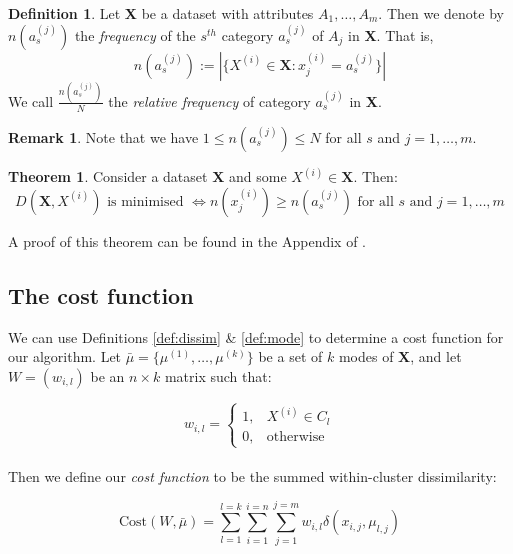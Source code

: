 \documentclass{article}
\theoremstyle{definition}
\newtheorem{definition}{Definition}[section]
\newtheorem{theorem}{Theorem}
\newtheorem*{remark}{Remark}
\begin{document}
\begin{definition}\label{def:rel-freq}
	Let \textbf{X} be a dataset with attributes $A_1, \ldots, A_m$. Then we
	denote by $n(a_s^{(j)})$ the \emph{frequency} of the $s^{th}$ category 
	$a_s^{(j)}$ of $A_j$ in \textbf{X}. That is, 
	\[
	n(a_s^{(j)}) := |{\{X^{(i)} \in \textbf{X}: x_j^{(i)} = a_s^{(j)}\}}|
	\]
	We call $\frac{n(a_s^{(j)})}{N}$ the \emph{relative frequency} of category 
    $a_s^{(j)}$ in \textbf{X}.
\end{definition}

\begin{remark}
	Note that we have $1 \le n(a_s^{(j)}) \le N$ for all $s$ and $j = 1, \ldots,
    m$. \\
\end{remark}

\begin{theorem}\label{theorem:1}
	Consider a dataset \textbf{X} and some $X^{(i)} \in \textbf{X}$. Then:
	\[
	D(\textbf{X}, X^{(i)}) \text{ is minimised } \iff n(x_j^{(i)}) \geq 
	n(a_s^{(j)}) \text{ for all } s \text{ and } j = 1, \ldots, m 
	\]
\end{theorem}
A proof of this theorem can be found in the Appendix of \cite{Huang98}. \\


\subsection{The cost function}\label{subsection:cost}

We can use Definitions \ref{def:dissim} \& \ref{def:mode} to determine a cost 
function for our algorithm. Let $\bar{\mu} = \{\mu^{(1)}, \ldots, \mu^{(k)}\}$ 
be a set of $k$ modes of \textbf{X}, and let $W = (w_{i,l})$ be an $n \times k$
matrix such that:

\[ 
w_{i,l} = \begin{cases}
		    1, & X^{(i)} \in C_l \\
            0, & \text{otherwise}
          \end{cases}
\] \\

Then we define our \emph{cost function} to be the summed within-cluster 
dissimilarity:

\begin{equation}
    \text{Cost}(W, \bar{\mu}) = \sum_{l=1}^{l=k} \sum_{i=1}^{i=n} 
                                \sum_{j=1}^{j=m} w_{i,l} 
                                \delta(x_{i,j}, \mu_{l,j})
\end{equation}
\end{document}
